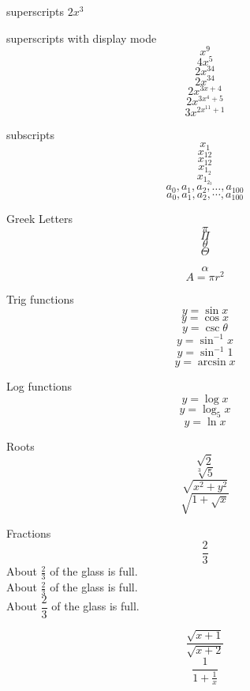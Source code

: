 \documentclass[11pt]{article} %
\begin{document}
superscripts $2x^3$

superscripts with display mode $$x^9$$
$$4x^5$$
$$2x^34$$
$$2x^{34}$$
$$2x^{3x+4}$$
$$2x^{3x^4+5}$$
$$3x^{2x^{11} + 1}$$

subscripts
$$x_1$$
$$x_12$$
$$x_{12}$$
$$x_{1_2}$$
$$x_{1_{2_3}}$$
$$a_0, a_1, a_2, \ldots, a_{100}$$ %
$$a_0, a_1, a_2, \cdots, a_{100}$$ %


Greek Letters
$$\pi$$ %
$$\Pi$$ %
$$\theta$$ %
$$\Theta$$ %

$$\alpha$$
$$A=\pi r^2$$

Trig functions
$$y=\sin x$$
$$y=\cos x$$
$$y=\csc \theta$$
$$y=\sin^{-1} x$$
$$y=\sin^{-1} 1$$
$$y=\arcsin x$$

Log functions
$$y=\log x$$
$$y=\log_5 x$$
$$y=\ln x$$

Roots
$$\sqrt{2}$$
$$\sqrt[3]{5}$$
$$\sqrt{x^2+y^2}$$
$$\sqrt{ 1+\sqrt{x} }$$

Fractions
$$\frac{2}{3}$$
About $\displaystyle \frac{2}{3}$ of the glass is full.\\[6pt]
About $\frac{2}{3}$ of the glass is full.\\[6pt]
About $\dfrac{2}{3}$ of the glass is full.

$$\frac{\sqrt{x+1}}{\sqrt{x+2}}$$
$$\frac{1}{1+{\frac{1}{x}}}$$
\end{document}
